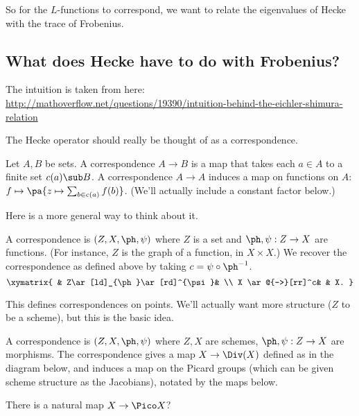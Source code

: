 So for the $L$-functions to correspond, we want to relate the eigenvalues of Hecke with the trace of Frobenius.
\subsection{What does Hecke have to do with Frobenius?}
The intuition is taken from here: \url{http://mathoverflow.net/questions/19390/intuition-behind-the-eichler-shimura-relation}

The Hecke operator should really be thought of as a correspondence.
\begin{df}[Take 1]
Let $A,B$ be sets.
A correspondence $A\to B$ is a map that takes each $a\in A$ to a finite set $c(a)\sub B$.
A correspondence $A\to A$ induces a map on functions on $A$: $f\mapsto \pa{z \mapsto \sum_{b\in c(a)}f(b)}$. (We'll actually include a constant factor below.)
\end{df}
Here is a more general way to think about it.
\begin{df}[Take 2]\label{df:correspondence2}
A correspondence is $(Z,X,\ph,\psi)$ where $Z$ is a set and $\ph,\psi:Z\to X$ are functions. (For instance, $Z$ is the graph of a function, in $X\times X$.) We recover the correspondence as defined above by taking $c=\psi\circ\ph^{-1}$.
\[
\xymatrix{
& Z\ar[ld]_{\ph}\ar[rd]^{\psi}& \\
X \ar@{-->}[rr]^c& & X.
}
\]
\end{df}
This defines correspondences on points.
We'll actually want more structure ($Z$ to be a scheme), but this is the basic idea.%
\begin{df}[Take 3]
A correspondence is $(Z,X,\ph,\psi)$ where $Z,X$ are schemes, $\ph,\psi:Z\to X$ are morphisms. The correspondence gives a map $X\to \Div(X)$ defined as in the diagram below, and induces a map on the Picard groups (which can be given scheme structure as the Jacobians), notated by the maps below.
\eeq
\end{df}
There is a natural map $X\to \Pico X$? 


